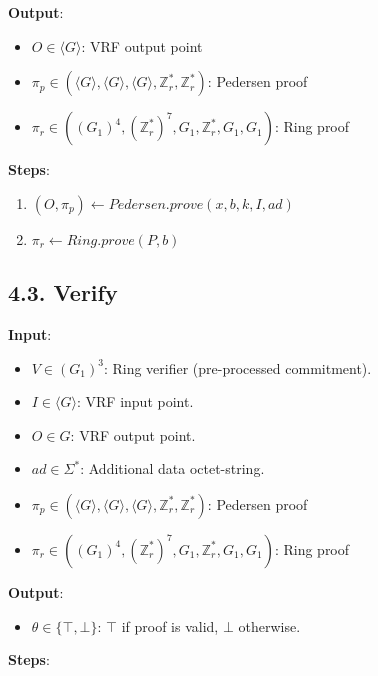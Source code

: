 \documentclass[
]{article}
\providecommand{\tightlist}{%
  \setlength{\itemsep}{0pt}\setlength{\parskip}{0pt}}
\begin{document}
\textbf{Output}:

\begin{itemize}
\tightlist
\item
  \(O \in \langle G \rangle\): VRF output point
\item
  \(\pi_p \in (\langle G \rangle, \langle G \rangle, \langle G \rangle, \mathbb{Z}^*_r, \mathbb{Z}^*_r)\):
  Pedersen proof
\item
  \(\pi_r \in ((G_1)^4, (\mathbb{Z}^*_r)^7, G_1, \mathbb{Z}^*_r, G_1, G_1)\):
  Ring proof
\end{itemize}

\textbf{Steps}:

\begin{enumerate}
\def\labelenumi{\arabic{enumi}.}
\tightlist
\item
  \((O, \pi_p) \gets Pedersen.prove(x, b, k, I, ad)\)
\item
  \(\pi_r \gets Ring.prove(P, b)\)
\end{enumerate}

\hypertarget{verify-2}{%
\subsection{4.3. Verify}\label{verify-2}}

\textbf{Input}:

\begin{itemize}
\tightlist
\item
  \(V \in (G_1)^3\): Ring verifier (pre-processed commitment).
\item
  \(I \in \langle G \rangle\): VRF input point.
\item
  \(O \in G\): VRF output point.
\item
  \(ad \in \Sigma^*\): Additional data octet-string.
\item
  \(\pi_p \in (\langle G \rangle, \langle G \rangle, \langle G \rangle, \mathbb{Z}^*_r, \mathbb{Z}^*_r)\):
  Pedersen proof
\item
  \(\pi_r \in ((G_1)^4, (\mathbb{Z}^*_r)^7, G_1, \mathbb{Z}^*_r, G_1, G_1)\):
  Ring proof
\end{itemize}

\textbf{Output}:

\begin{itemize}
\tightlist
\item
  \(\theta \in \{ \top, \bot \}\): \(\top\) if proof is valid, \(\bot\)
  otherwise.
\end{itemize}

\textbf{Steps}:
\end{document}
